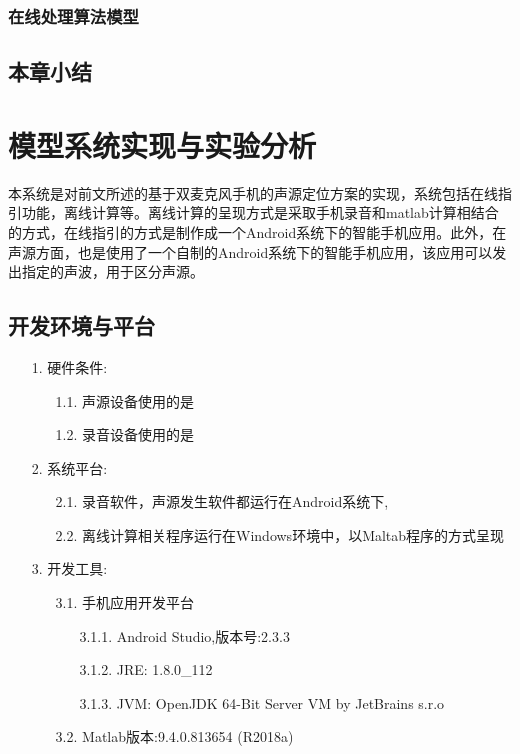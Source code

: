 \documentclass[winfonts]{njuthesis}
\begin{document}
		\subsection{在线处理算法模型}
	
			
	
	\section{本章小结}	
	
\chapter{模型系统实现与实验分析}
	
	本系统是对前文所述的基于双麦克风手机的声源定位方案的实现，系统包括在线指引功能，离线计算等。离线计算的呈现方式是采取手机录音和matlab计算相结合的方式，在线指引的方式是制作成一个Android系统下的智能手机应用。此外，在声源方面，也是使用了一个自制的Android系统下的智能手机应用，该应用可以发出指定的声波，用于区分声源。
	
	
	\section{开发环境与平台}
		
		\begin{enumerate}
			\item[1.] 硬件条件:
				\begin{enumerate}
					\item[1.1.] 声源设备使用的是
					\item[1.2.] 录音设备使用的是
				\end{enumerate}
			\item[2.] 系统平台:
				\begin{enumerate}
					\item[2.1.] 录音软件，声源发生软件都运行在Android系统下,
					\item[2.2.] 离线计算相关程序运行在Windows环境中，以Maltab程序的方式呈现	
				\end{enumerate}
			\item[3.] 开发工具:
				\begin{enumerate}
					\item[3.1.] 手机应用开发平台
						\begin{enumerate}
							\item[3.1.1.] Android Studio,版本号:2.3.3
							\item[3.1.2.] JRE: 1.8.0\_112
							\item[3.1.3.] JVM: OpenJDK 64-Bit Server VM by JetBrains s.r.o		
						\end{enumerate}			
					\item[3.2.] Matlab版本:9.4.0.813654 (R2018a)
				\end{enumerate}	
		\end{enumerate}
	
\end{document}
